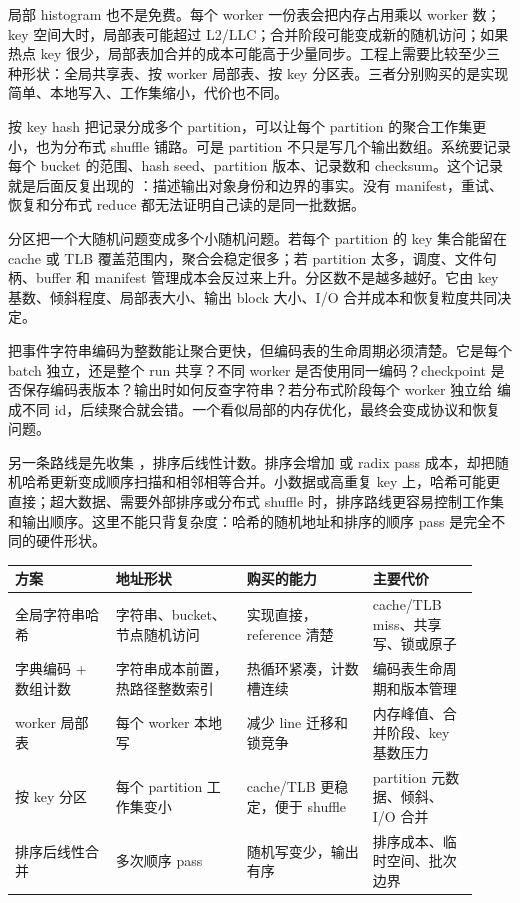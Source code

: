 局部 histogram 也不是免费。每个 worker 一份表会把内存占用乘以 worker 数；key 空间大时，局部表可能超过 L2/LLC；合并阶段可能变成新的随机访问；如果热点 key 很少，局部表加合并的成本可能高于少量同步。工程上需要比较至少三种形状：全局共享表、按 worker 局部表、按 key 分区表。三者分别购买的是实现简单、本地写入、工作集缩小，代价也不同。

按 key hash 把记录分成多个 partition，可以让每个 partition 的聚合工作集更小，也为分布式 shuffle 铺路。可是 partition 不只是写几个输出数组。系统要记录每个 bucket 的范围、hash seed、partition 版本、记录数和 checksum。这个记录就是后面反复出现的 ：描述输出对象身份和边界的事实。没有 manifest，重试、恢复和分布式 reduce 都无法证明自己读的是同一批数据。

分区把一个大随机问题变成多个小随机问题。若每个 partition 的 key 集合能留在 cache 或 TLB 覆盖范围内，聚合会稳定很多；若 partition 太多，调度、文件句柄、buffer 和 manifest 管理成本会反过来上升。分区数不是越多越好。它由 key 基数、倾斜程度、局部表大小、输出 block 大小、I/O 合并成本和恢复粒度共同决定。

把事件字符串编码为整数能让聚合更快，但编码表的生命周期必须清楚。它是每个 batch 独立，还是整个 run 共享？不同 worker 是否使用同一编码？checkpoint 是否保存编码表版本？输出时如何反查字符串？若分布式阶段每个 worker 独立给  编成不同 id，后续聚合就会错。一个看似局部的内存优化，最终会变成协议和恢复问题。

另一条路线是先收集 ，排序后线性计数。排序会增加  或 radix pass 成本，却把随机哈希更新变成顺序扫描和相邻相等合并。小数据或高重复 key 上，哈希可能更直接；超大数据、需要外部排序或分布式 shuffle 时，排序路线更容易控制工作集和输出顺序。这里不能只背复杂度：哈希的随机地址和排序的顺序 pass 是完全不同的硬件形状。

\begin{center}
\small
\begin{tabular}{@{}p{0.20\linewidth}p{0.26\linewidth}p{0.25\linewidth}p{0.21\linewidth}@{}}
\toprule
方案 & 地址形状 & 购买的能力 & 主要代价 \\
\midrule
全局字符串哈希 & 字符串、bucket、节点随机访问 & 实现直接，reference 清楚 & cache/TLB miss、共享写、锁或原子 \\
字典编码 + 数组计数 & 字符串成本前置，热路径整数索引 & 热循环紧凑，计数槽连续 & 编码表生命周期和版本管理 \\
worker 局部表 & 每个 worker 本地写 & 减少 line 迁移和锁竞争 & 内存峰值、合并阶段、key 基数压力 \\
按 key 分区 & 每个 partition 工作集变小 & cache/TLB 更稳定，便于 shuffle & partition 元数据、倾斜、I/O 合并 \\
排序后线性合并 & 多次顺序 pass & 随机写变少，输出有序 & 排序成本、临时空间、批次边界 \\
\bottomrule
\end{tabular}
\end{center}

